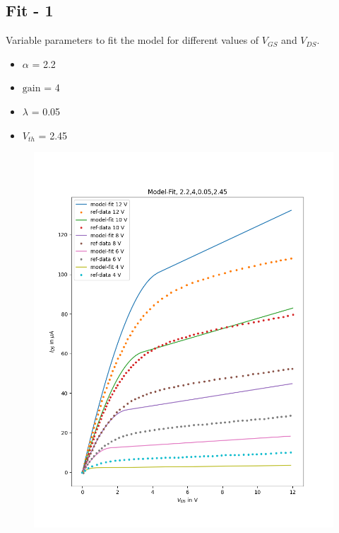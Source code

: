 \documentclass{article}
\begin{document}
\subsection*{Fit - 1}
Variable parameters to fit the model for different values of $V_{GS}$ and $V_{DS}$. 
\begin{itemize}
    \item $\alpha$ = 2.2
    \item $\text{gain}$ = 4
    \item $\lambda$ = 0.05
    \item $V_{th}$ = 2.45
\end{itemize}
\begin{figure}
    \label{fig:model-fit-1}
    \includegraphics[scale = 0.4]{../Images/Previous/Model-Fit-2.2-4-0.05-2.45.png}
\end{figure}
\newpage
\end{document}
